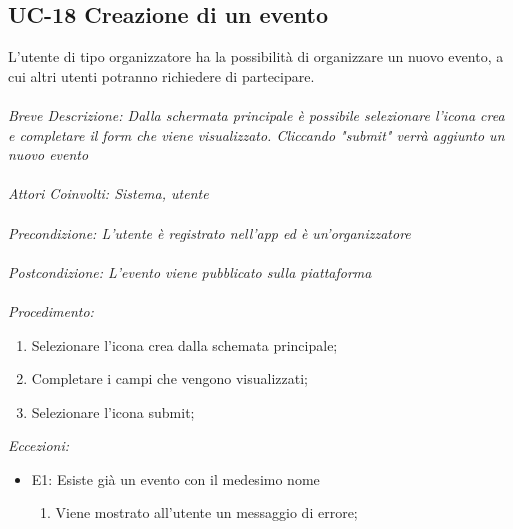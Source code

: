 \subsection{UC-18 Creazione di un evento}
L'utente di tipo organizzatore ha la possibilità di organizzare un nuovo evento, a cui altri utenti potranno richiedere di partecipare.
\\
\\
\textit{Breve Descrizione: Dalla schermata principale è possibile selezionare l'icona crea e completare il form che viene visualizzato. Cliccando "submit" verrà aggiunto un nuovo evento} 
\\
\\
\textit{Attori Coinvolti: Sistema, utente}
\\
\\
\textit{Precondizione: L'utente è registrato nell'app ed è un'organizzatore}
\\
\\
\textit{Postcondizione: L'evento viene pubblicato sulla piattaforma}
\\
\\
\textit{Procedimento:}
\begin{enumerate}
	\item Selezionare l'icona crea dalla schemata principale;
	\item Completare i campi che vengono visualizzati;
	\item Selezionare l'icona submit;
\end{enumerate}


\textit{Eccezioni:}
\begin{itemize}
	\item E1: Esiste già un evento con il medesimo nome
	\begin{enumerate}
		\item Viene mostrato all'utente un messaggio di errore;
	\end{enumerate}
\end{itemize}